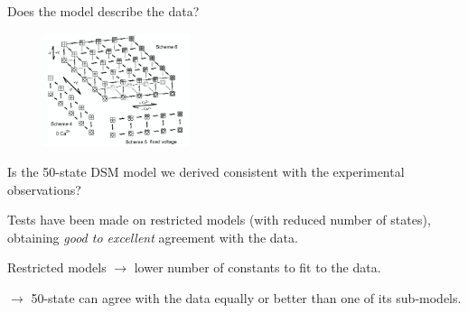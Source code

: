 \documentclass{beamer}
\begin{document}
\begin{frame}{Does the model describe the data?}
\begin{figure}
  \begin{center}
    \includegraphics[width=0.38\textwidth]{50_State_Model.png}
  \end{center}
\end{figure}
Is the 50-state DSM model we derived consistent with the experimental observations?

Tests have been made on restricted models (with reduced number of states), obtaining \emph{good to excellent} agreement with the data.

Restricted models $\rightarrow$ lower number of constants to fit to the data.


$\rightarrow$ 50-state can agree with the data equally or better than one of its sub-models.

\end{frame}



\end{document}
